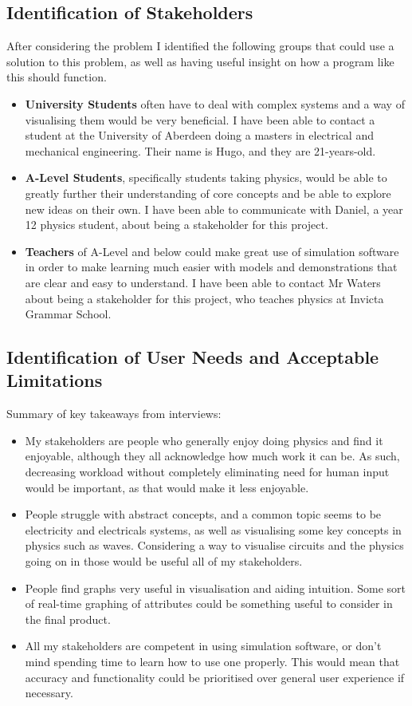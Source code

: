 \documentclass[11pt]{article}
\begin{document}
        \subsection{Identification of Stakeholders}
            After considering the problem I identified the following groups that could use a solution to this problem, as well as having useful insight on how a program like this should function.
            \begin{itemize}
                \item \textbf{University Students} often have to deal with complex systems and a way of visualising them would be very beneficial. I have been able to contact a student at the University of Aberdeen doing a masters in electrical and mechanical engineering. Their name is Hugo, and they are 21-years-old.
                \item \textbf{A-Level Students}, specifically students taking physics,  would be able to greatly further their understanding of core concepts and be able to explore new ideas on their own. I have been able to communicate with Daniel, a year 12 physics student, about being a stakeholder for this project.
                \item \textbf{Teachers} of A-Level and below could make great use of simulation software in order to make learning much easier with models and demonstrations that are clear and easy to understand. I have been able to contact Mr Waters about being a stakeholder for this project, who teaches physics at Invicta Grammar School.
            \end{itemize}
            
        \subsection{Identification of User Needs and Acceptable Limitations}
            Summary of key takeaways from interviews:
            \begin{itemize}
                \item My stakeholders are people who generally enjoy doing physics and find it enjoyable, although they all acknowledge how much work it can be. As such, decreasing workload without completely eliminating need for human input would be important, as that would make it less enjoyable.
                \item People struggle with abstract concepts, and a common topic seems to be electricity and electricals systems, as well as visualising some key concepts in physics such as waves. Considering a way to visualise circuits and the physics going on in those would be useful all of my stakeholders.
                \item People find graphs very useful in visualisation and aiding intuition. Some sort of real-time graphing of attributes could be something useful to consider in the final product.
                \item All my stakeholders are competent in using simulation software, or don't mind spending time to learn how to use one properly. This would mean that accuracy and functionality could be prioritised over general user experience if necessary. 
            \end{itemize}
\end{document}

